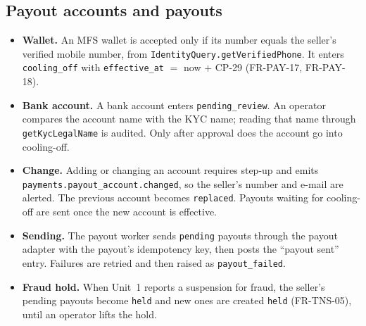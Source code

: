 \documentclass[11pt,a4paper]{article}
\begin{document}
\subsection{Payout accounts and payouts}
\label{sec:payouts}
\begin{itemize}[nosep]
  \item \textbf{Wallet.} An MFS wallet is accepted only if its number equals the seller's verified mobile number, from \texttt{IdentityQuery.getVerifiedPhone}. It enters \texttt{cooling\_off} with \texttt{effective\_at} $=$ now $+$ CP-29 (FR-PAY-17, FR-PAY-18).
  \item \textbf{Bank account.} A bank account enters \texttt{pending\_review}. An operator compares the account name with the KYC name; reading that name through \texttt{getKycLegalName} is audited. Only after approval does the account go into cooling-off.
  \item \textbf{Change.} Adding or changing an account requires step-up and emits \texttt{payments.\allowbreak payout\_account.\allowbreak changed}, so the seller's number and e-mail are alerted. The previous account becomes \texttt{replaced}. Payouts waiting for cooling-off are sent once the new account is effective.
  \item \textbf{Sending.} The payout worker sends \texttt{pending} payouts through the payout adapter with the payout's idempotency key, then posts the ``payout sent'' entry. Failures are retried and then raised as \texttt{payout\_failed}.
  \item \textbf{Fraud hold.} When Unit~1 reports a suspension for fraud, the seller's pending payouts become \texttt{held} and new ones are created \texttt{held} (FR-TNS-05), until an operator lifts the hold.
\end{itemize}
\end{document}

